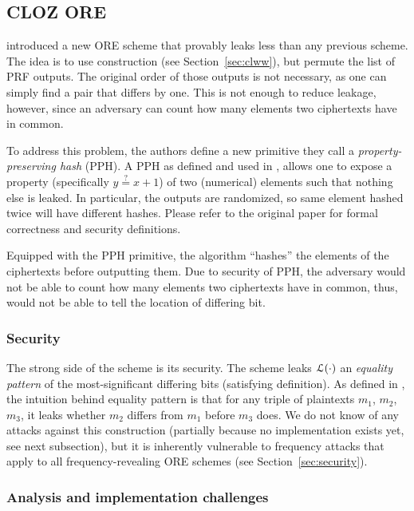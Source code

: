 \subsection{CLOZ ORE}

	\textcite{parameter-hiding-ore} introduced a new ORE scheme that provably leaks less than any previous scheme.
	The idea is to use \textcite{clww-ore} construction (see Section~\ref{sec:clww}), but permute the list of PRF outputs.
	The original order of those outputs is not necessary, as one can simply find a pair that differs by one.
	This is not enough to reduce leakage, however, since an adversary can count how many elements two ciphertexts have in common.

	To address this problem, the authors define a new primitive they call a \emph{property-preserving hash} (PPH).
	A PPH as defined and used in \cite{parameter-hiding-ore}, allows one to expose a property (specifically $y \overset{?}{=} x + 1$) of two (numerical) elements such that nothing else is leaked.
	In particular, the outputs are randomized, so same element hashed twice will have different hashes.
	Please refer to the original paper \cite{parameter-hiding-ore} for formal correctness and security definitions.

	Equipped with the PPH primitive, the algorithm ``hashes'' the elements of the ciphertexts before outputting them.
	Due to security of PPH, the adversary would not be able to count how many elements two ciphertexts have in common, thus, would not be able to tell the location of differing bit.

	\subsubsection{Security}
		The strong side of the scheme is its security.
		The scheme leaks $\mathcal{L}(\cdot)$ an \emph{equality pattern} of the most-significant differing bits (satisfying \textcite{clww-ore} definition).
		As defined in \cite{parameter-hiding-ore}, the intuition behind equality pattern is that for any triple of plaintexts $m_1$, $m_2$, $m_3$, it leaks whether $m_2$ differs from $m_1$ before $m_3$ does. %
		We do not know of any attacks against this construction (partially because no implementation exists yet, see next subsection), but it is inherently vulnerable to frequency attacks that apply to all frequency-revealing ORE schemes (see Section~\ref{sec:security}).

	\subsubsection{Analysis and implementation challenges}


